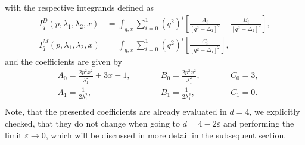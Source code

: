 with the respective integrands defined as
\begin{align}
I_q^D\left(p, \lambda_1, \lambda_2,x\right)&=\int_{q, x} \sum_{i=0}^{1}\left(q^{2}\right)^{i}\left[\frac{A_{i}}{\left[q^{2}+\Delta_{1}\right]^{2}}-\frac{B_{i}}{\left[q^{2}+\Delta_{2}\right]^{2}}\right],\\
I_q^M\left(p, \lambda_1, \lambda_2,x\right)&=\int_{q, x} \sum_{i=0}^{1}\left(q^{2}\right)^{i}\left[\frac{C_{i}}{\left[q^{2}+\Delta_{1}\right]^{2}}\right],
\end{align}
and the  coefficients are given by
\begin{equation}
\begin{alignedat}{3}
&A_0 = \frac{2p^2x^2}{\lambda_1^2}+ 3x -1,   \qquad  &&B_0 = \frac{2p^2x^2}{\lambda_1^2},    \qquad       &&C_0 = 3, \\
&A_1 = \frac{1}{2\lambda_1^2},  			 \qquad  &&B_1 = \frac{1}{2\lambda_1^2},          \qquad  	  &&C_1 = 0. \\
\end{alignedat}
\end{equation}
Note, that the presented coefficients are already evaluated in $d=4$, we explicitly checked, that they do not change when going to $d=4-2\varepsilon$ and performing the limit $\varepsilon\rightarrow 0$, which will be discussed in more detail in the subsequent section.

